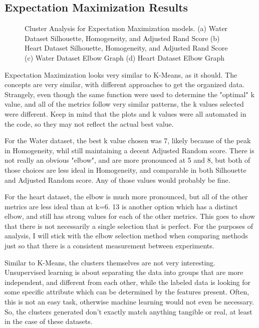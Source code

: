 \documentclass[
	letterpaper, %
]{mlreport}
\begin{document}
\subsection{Expectation Maximization Results}
\begin{figure}
	\centering
	\caption{Cluster Analysis for Expectation Maximization models. (a) Water Dataset Silhouette, Homogeneity, and Adjusted Rand Score (b) Heart Dataset Silhouette, Homogeneity, and Adjusted Rand Score (c) Water Dataset Elbow Graph (d) Heart Dataset Elbow Graph}
	\label{fig:fig2}
\end{figure}
Expectation Maximization looks very similar to K-Means, as it should. The concepts are very similar, with different approaches to get the organized data. Strangely, even though the same function were used to determine the "optimal" k value, and all of the metrics follow very similar patterns, the k values selected were different. Keep in mind that the plots and k values were all automated in the code, so they may not reflect the actual best value.

For the Water dataset, the best k value chosen was 7, likely because of the peak in Homogeneity, whil still maintaining a decent Adjusted Random score. There is not really an obvious "elbow", and are more pronounced at 5 and 8, but both of those choices are less ideal in Homogeneity, and comparable in both Silhouette and Adjusted Random score. Any of those values would probably be fine.

For the heart dataset, the elbow is much more pronounced, but all of the other metrics are less ideal than at k=6. 13 is another option which has a distinct elbow, and still has strong values for each of the other metrics. This goes to show that there is not necessarily a single selection that is perfect. For the purposes of analysis, I will stick with the elbow selection method when comparing methods just so that there is a consistent measurement between experiments.

Similar to K-Means, the clusters themselves are not very interesting. Unsupervised learning is about separating the data into groups that are more independent, and different from each other, while the labeled data is looking for some specific attribute which can be determined by the features present. Often, this is not an easy task, otherwise machine learning would not even be necessary. So, the clusters generated don't exactly match anything tangible or real, at least in the case of these datasets.
\end{document}
